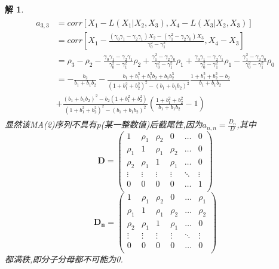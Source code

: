 \documentclass[11pt,a4paper]{ctexart}
\newtheorem*{solution}{解}
\begin{document}
\begin{enumerate}
\begin{solution}
\begin{equation}
	\begin{aligned}
	\begin{split}
		a_{3,3}
		&=corr[X_1-L(X_1|X_2,X_3),X_4-L(X_3|X_2,X_3)]\\
		&=corr[X_1-\frac{(\gamma_0\gamma_1-\gamma_2\gamma_1)X_2-(\gamma_1^2-\gamma_2\gamma_0)X_3}{\gamma_0^2-\gamma_1^2},X_4-X_3]\\
		&=\rho_3-\rho_2
		-\frac{\gamma_0\gamma_1-\gamma_2\gamma_1}{\gamma_0^2-\gamma_1^2}\rho_2
		+\frac{\gamma_1^2-\gamma_2\gamma_0}{\gamma_0^2-\gamma_1^2}\rho_1
		+\frac{\gamma_0\gamma_1-\gamma_2\gamma_1}{\gamma_0^2-\gamma_1^2}\rho_1
		-\frac{\gamma_1^2-\gamma_2\gamma_0}{\gamma_0^2-\gamma_1^2}\rho_0\\
		&= -\frac{b_2}{b_1+b_1b_2}-\frac{b_1+b_1^3+b_1^3b_2+b_1b_2^3}{(1+b_1^2+b_2^2)^2-(b_1+b_1b_2)^2}\frac{1+b_1^2+b_2^2-b_2}{b_1+b_1b_2}\\
		&+\frac{(b_1+b_1b_2)^2-b_2(1+b_1^2+b_2^2)}{(1+b_1^2+b_2^2)^2-(b_1+b_1b_2)^2}
		(\frac{1+b_1^2+b_2^2}{b_1+b_1b_2}-1)
	\end{split}
	\end{aligned} 
\end{equation}
显然该MA(2)序列不具有p(某一整数值)后截尾性,因为$ a_{n,n}=\frac{D_n}{D} $,其中
\[
\mathbf{D} = \left(
\begin{array}{cccccc}
	1      & \rho_1 & \rho_2 &0     & \ldots & 0\\
	\rho_1 & 1      & \rho_1 &\rho_2& \ldots & 0\\
	\rho_2 & \rho_1 & 1      & \rho_1& \ldots & 0\\
	\vdots & \vdots &\vdots &\vdots & \ddots & \vdots\\
	0 & 0& 0& 0 & \ldots & 1\\
\end{array} \right)
\]
\[
\mathbf{D_n} = \left(
\begin{array}{cccccc}
	1      & \rho_1 & \rho_2 &0     & \ldots & \rho_1\\
	\rho_1 & 1      & \rho_1 &\rho_2& \ldots & \rho_2\\
	\rho_2 & \rho_1 & 1      & \rho_1& \ldots & 0\\
	\vdots & \vdots &\vdots &\vdots & \ddots & \vdots\\
	0 & 0& 0& 0 & \ldots & 0\\
\end{array} \right)
\]
都满秩,即分子分母都不可能为0.
\end{solution}

\end{enumerate}
\end{document}
